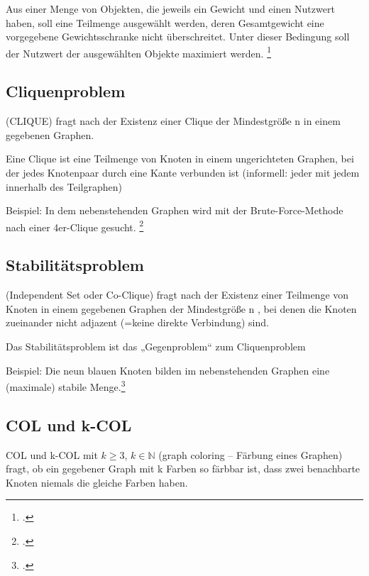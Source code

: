 \documentclass{lehramt-informatik-haupt}
\begin{document}
Aus einer Menge von Objekten, die jeweils ein Gewicht und einen Nutzwert
haben, soll eine Teilmenge ausgewählt werden, deren Gesamtgewicht eine
vorgegebene Gewichtsschranke nicht überschreitet. Unter dieser Bedingung
soll der Nutzwert der ausgewählten Objekte maximiert werden.
\footcite[Seite 75]{theo:fs:4}

%

\subsection{Cliquenproblem}

(CLIQUE) fragt nach der Existenz einer Clique der Mindestgröße n in
einem gegebenen Graphen.

Eine Clique ist eine Teilmenge von Knoten in einem ungerichteten
Graphen, bei der jedes Knotenpaar durch eine Kante verbunden ist
(informell: jeder mit jedem innerhalb des Teilgraphen)

Beispiel: In dem nebenstehenden Graphen wird mit der Brute-Force-Methode
nach einer 4er-Clique gesucht.
\footcite[Seite 76]{theo:fs:4}

%

\subsection{Stabilitätsproblem}

(Independent Set oder Co-Clique) fragt nach der Existenz einer Teilmenge
von Knoten in einem gegebenen Graphen der Mindestgröße n , bei denen die
Knoten zueinander nicht adjazent (=keine direkte Verbindung) sind.

Das Stabilitätsproblem ist das „Gegenproblem“ zum Cliquenproblem

Beispiel: Die neun blauen Knoten bilden im nebenstehenden Graphen eine
(maximale) stabile Menge.\footcite[Seite 77]{theo:fs:4}

%

\subsection{COL und k-COL}

COL und k-COL mit $k \geq 3$, $k \in \mathbb{N}$ (graph coloring –
Färbung eines Graphen) fragt, ob ein gegebener Graph mit k Farben so
färbbar ist, dass zwei benachbarte Knoten niemals die gleiche Farben
haben.

\literatur
\end{document}
